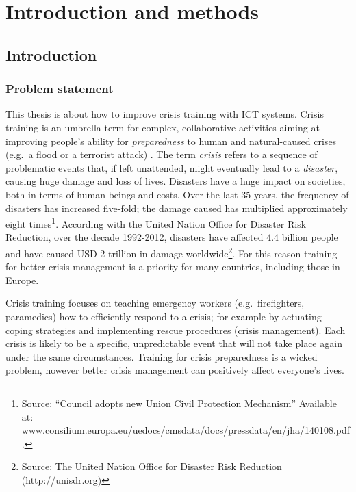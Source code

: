 \mainmatter

\part[Part I]{Introduction and methods}

\chapter{Introduction}\label{introduction}

\section{Problem statement}\label{problem-statement}

This thesis is about how to improve crisis training with ICT systems. Crisis training is an umbrella term for complex, collaborative activities aiming at improving people's ability for \emph{preparedness} to human and natural-caused crises (e.g.~a flood or a terrorist attack) \autocite{Lagadec:1997js}. The term \emph{crisis} refers to a sequence of problematic events that, if left unattended, might eventually lead to a \emph{disaster}, causing huge damage and loss of lives. Disasters have a huge impact on societies, both in terms of human beings and costs. Over the last 35 years, the frequency of disasters has increased five-fold; the damage caused has multiplied approximately eight times\footnote{Source: ``Council adopts new Union Civil Protection Mechanism'' Available at: www.consilium.europa.eu/uedocs/cmsdata/docs/pressdata/en/jha/140108.pdf.}. According with the United Nation Office for Disaster Risk Reduction, over the decade 1992-2012, disasters have affected 4.4 billion people and have caused USD 2 trillion in damage worldwide\footnote{Source: The United Nation Office for Disaster Risk Reduction (http://unisdr.org)}. For this reason training for better crisis management is a priority for many countries, including those in Europe.

Crisis training focuses on teaching emergency workers (e.g.~firefighters, paramedics) how to efficiently respond to a crisis; for example by actuating coping strategies and implementing rescue procedures (crisis management). Each crisis is likely to be a specific, unpredictable event that will not take place again under the same circumstances. Training for crisis preparedness is a wicked problem, however better crisis management can positively affect everyone's lives.

